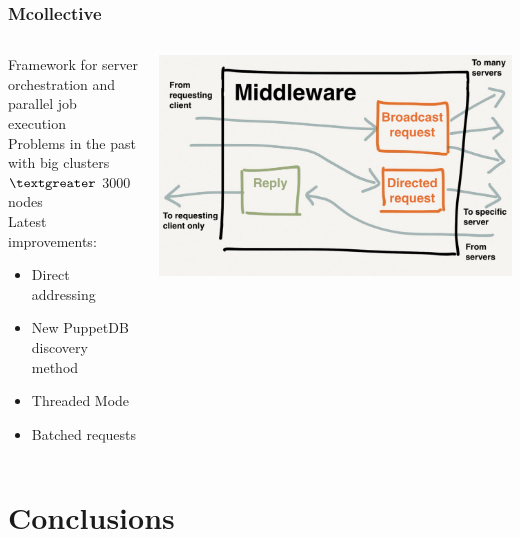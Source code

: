 \documentclass[aspectratio=169]{beamer}
\begin{document}
\begin{frame}
    \frametitle{Mcollective}
    \begin{minipage}[T]{0.95\textwidth}
        \begin{columns}
            \begin{column}{0.5\textwidth}
                Framework for server orchestration and parallel
                job execution \\[2em]

                Problems in the past with big clusters \\
                $\textgreater$ 3000 nodes \\[2em]

                Latest improvements:
                \begin{itemize}
                    \item Direct addressing
                    \item New PuppetDB discovery method
                    \item Threaded Mode
                    \item Batched requests
                \end{itemize}
            \end{column}
            \begin{column}{0.5\textwidth}
            \includegraphics[width=1.1\textwidth]{mco.png}
            \end{column}
        \end{columns}
   \end{minipage}
\end{frame}

\section{Conclusions}
\end{document}
